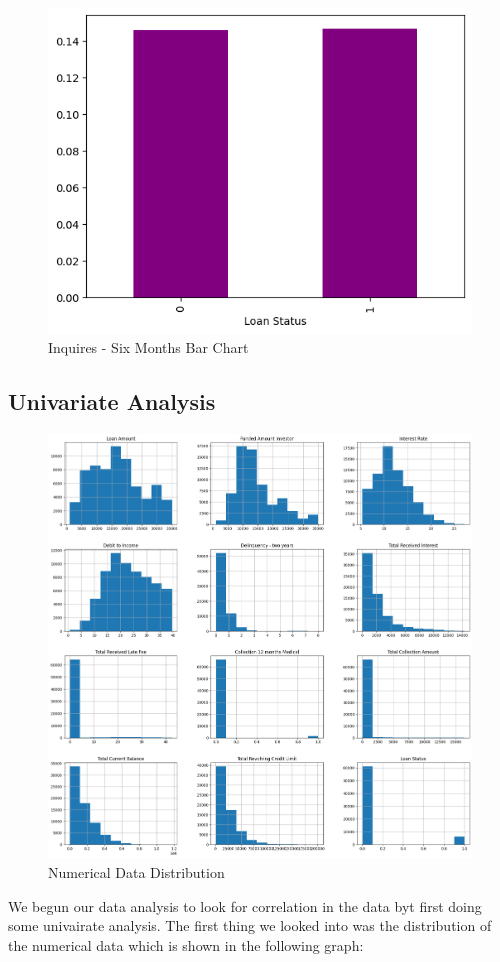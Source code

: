 \documentclass[sigplan]{acmart}
\begin{document}
\begin{figure}[h]
    \includegraphics[width=\linewidth]{images/inquires six months.png}
    \caption{Inquires - Six Months Bar Chart}
\end{figure}

\subsection{Univariate Analysis}
\begin{figure}[h]
    \centering
    \includegraphics[width=\linewidth]{images/univariate_hist.png}
    \caption{Numerical Data Distribution}
\end{figure}
We begun our data analysis to look for correlation in the data byt first doing some univairate analysis.
The first thing we looked into was the distribution of the numerical data which is shown in the following graph:
\end{document}
